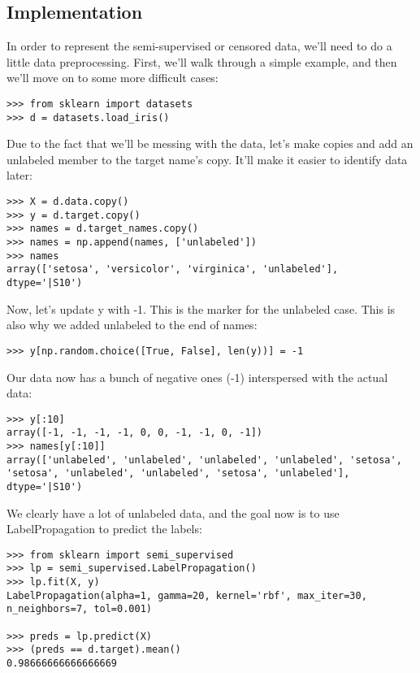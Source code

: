 \documentclass[SKL-MASTER.tex]{subfiles}
\begin{document}
\subsection{Implementation}
In order to represent the semi-supervised or censored data, we'll need to do a little data
preprocessing. First, we'll walk through a simple example, and then we'll move on to some
more difficult cases:
\begin{framed}
	\begin{verbatim}
>>> from sklearn import datasets
>>> d = datasets.load_iris()
\end{verbatim}
\end{framed}
Due to the fact that we'll be messing with the data, let's make copies and add an unlabeled
member to the target name's copy. It'll make it easier to identify data later:
\begin{framed}
\begin{verbatim}
>>> X = d.data.copy()
>>> y = d.target.copy()
>>> names = d.target_names.copy()
>>> names = np.append(names, ['unlabeled'])
>>> names
array(['setosa', 'versicolor', 'virginica', 'unlabeled'],
dtype='|S10')
\end{verbatim}
\end{framed}
Now, let's update y with -1. This is the marker for the unlabeled case. This is also why we
added unlabeled to the end of names:
\begin{framed}
\begin{verbatim}
>>> y[np.random.choice([True, False], len(y))] = -1
\end{verbatim}
\end{framed}
Our data now has a bunch of negative ones (-1) interspersed with the actual data:
\begin{framed}
	\begin{verbatim}
>>> y[:10]
array([-1, -1, -1, -1, 0, 0, -1, -1, 0, -1])
>>> names[y[:10]]
array(['unlabeled', 'unlabeled', 'unlabeled', 'unlabeled', 'setosa',
'setosa', 'unlabeled', 'unlabeled', 'setosa', 'unlabeled'],
dtype='|S10')
\end{verbatim}
\end{framed}
We clearly have a lot of unlabeled data, and the goal now is to use LabelPropagation to
predict the labels:
\begin{framed}
	\begin{verbatim}
>>> from sklearn import semi_supervised
>>> lp = semi_supervised.LabelPropagation()
>>> lp.fit(X, y)
LabelPropagation(alpha=1, gamma=20, kernel='rbf', max_iter=30,
n_neighbors=7, tol=0.001)

>>> preds = lp.predict(X)
>>> (preds == d.target).mean()
0.98666666666666669
\end{verbatim}
\end{framed}
\end{document}
